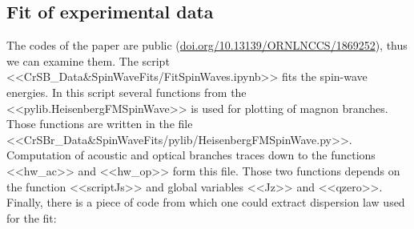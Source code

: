 \documentclass[a4paper,12pt]{article}
\begin{document}
        \subsection{Fit of experimental data}
            The codes of the paper are public (\url{doi.org/10.13139/ORNLNCCS/1869252}), thus we can examine them. 
            The script <<CrSB\_Data\&SpinWaveFits/FitSpinWaves.ipynb>> fits the spin-wave energies. 
            In this script several functions from the <<pylib.HeisenbergFMSpinWave>> is used for plotting of magnon branches. 
            Those functions are written in the file <<CrSBr\_Data\&SpinWaveFits/pylib/HeisenbergFMSpinWave.py>>.
            Computation of acoustic and optical branches traces down to the functions <<hw\_ac>> and <<hw\_op>> form this file.
            Those two functions depends on the function <<scriptJs>> and global variables <<Jz>> and <<qzero>>. 
            Finally, there is a piece of code from which one could extract dispersion law used for the fit:
\end{document}
